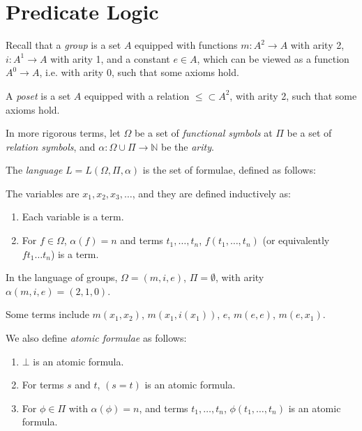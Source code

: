 \documentclass[12pt]{article}
\begin{document}
\newpage

\section{Predicate Logic}
\label{sec:predicate_logic}

Recall that a \emph{group} is a set $A$ equipped with functions $m : A^2 \to A$ with arity 2, $i : A^{1} \to A$ with arity 1, and a constant $e \in A$, which can be viewed as a function $A^{0} \to A$, i.e. with arity $0$, such that some axioms hold.

A \emph{poset} is a set $A$ equipped with a relation $\leq \subset A^2$, with arity 2, such that some axioms hold.


In more rigorous terms, let $\Omega$ be a set of \emph{functional symbols} at $\Pi$ be a set of \emph{relation symbols}, and $\alpha : \Omega \cup \Pi \to \mathbb{N}$ be the \emph{arity}.

The \emph{language} $L = L(\Omega, \Pi, \alpha)$ is the set of formulae, defined as follows:

The variables are $x_1, x_2, x_3, \ldots$, and they are defined inductively as:
\begin{enumerate}
	\item Each variable is a term.
	\item For $f \in \Omega$, $\alpha(f) = n$ and terms $t_1, \ldots, t_n$, $f(t_1, \ldots, t_n)$ (or equivalently $ft_1\ldots t_n$) is a term.
\end{enumerate}

\begin{exbox}
	In the language of groups, $\Omega = (m, i, e)$, $\Pi = \emptyset$, with arity $\alpha(m,i,e) = (2,1,0)$.

	Some terms include $m(x_1, x_2)$, $m(x_1,i(x_1))$, $e$, $m(e, e)$, $m(e, x_1)$.
\end{exbox}

We also define \emph{atomic formulae} as follows:
\begin{enumerate}
	\item $\bot$ is an atomic formula.
	\item For terms $s$ and $t$, $(s = t)$ is an atomic formula.
	\item For $\phi \in \Pi$ with $\alpha(\phi) = n$, and terms $t_1, \ldots, t_n$, $\phi(t_1, \ldots, t_n)$ is an atomic formula.
\end{enumerate}
\end{document}
